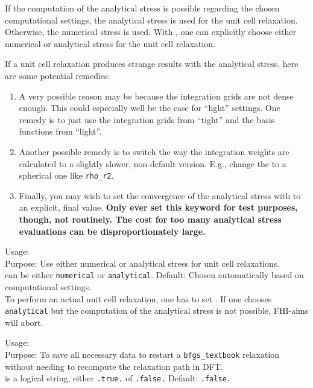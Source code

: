 If the computation of the analytical stress is possible regarding the chosen
computational settings, the analytical stress is used for the unit cell
relaxation. Otherwise, the numerical stress is used. With
, one can explicitly choose either numerical or
analytical stress for the unit cell relaxation.

If a unit cell relaxation produces strange results with the analytical
stress, here are some potential remedies:
\begin{enumerate}
  \item A very possible reason may be because the integration grids
    are not dense enough. This could especially well be the case for
    ``light'' settings. One remedy is to just use the integration
    grids from ``tight'' and the basis functions from ``light''. 
  \item Another possible remedy is to switch the way the integration
    weights are calculated to a slightly slower, non-default
    version. E.g., change the  to a spherical
    one like \texttt{rho\_r2}. 
  \item Finally, you may wish to set the convergence of the analytical
    stress with  to an explicit, final
    value. \textbf{Only ever set this keyword for test purposes,
    though, not routinely. The cost for too many analytical stress
    evaluations can be disproportionately large.}
\end{enumerate}

{
  \noindent
  Usage:   \\[1.0ex]
  Purpose: Use either numerical or analytical stress for unit cell
  relaxations.\\[1.0ex] 
   can be either \texttt{numerical} or
    \texttt{analytical}. Default: Chosen automatically based on computational
    settings. \\
}
To perform an actual unit cell relaxation, one has to set
. If one chooses \texttt{analytical} but the 
computation of the analytical stress is not possible, FHI-aims will abort.

{
  \noindent
  Usage:  
    \\[1.0ex]
  Purpose: To save all necessary data to restart a \texttt{bfgs\_textbook}
    relaxation without needing to recompute the relaxation path in
    DFT. \\[1.0ex] 
  is a logical string, either \texttt{.true.} of
 \texttt{.false.} Default: \texttt{.false.} \\
}

